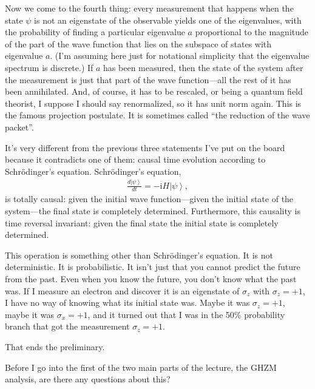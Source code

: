 \documentclass[twocolumn,prb]{revtex4}
\newcommand{\ket}[1]{\left|#1\right\rangle}
\renewcommand{\i}{\text{i}}
\begin{document}
Now we come to the fourth thing:  every measurement that happens when the state $\psi$ is not an eigenstate of the observable yields one of the eigenvalues, with the probability of finding a particular eigenvalue $a$ proportional to the magnitude of the part of the wave function that lies on the subspace of states with eigenvalue $a$. (I'm assuming here just for notational simplicity that the eigenvalue spectrum is discrete.) If $a$ has been measured, then the state of the system after the measurement is just that part of the wave function---all the rest of it has been annihilated. And, of course, it has to be rescaled, or being a quantum field theorist, I suppose I should say renormalized, so it has unit norm again. This is the famous projection postulate.  It is sometimes called ``the reduction of the wave packet''. 

It's very different from the previous three statements I've put on the board because it contradicts one of them: causal time evolution according to Schrödinger's equation.  Schrödinger's equation,
\begin{align}
  \frac{d\ket{\psi}}{dt} = -\i H\ket{\psi},
\end{align}
is totally causal: given the initial wave function---given the initial state of the system---the final state is completely determined. Furthermore, this causality is time reversal invariant: given the final state the initial state is completely determined.

This operation is something other than Schrödinger's equation. It is not deterministic. It is probabilistic. It isn't just that you cannot predict the future from the past. Even when you know the future, you don't know what the past was. If I measure an electron and discover it is an eigenstate of $\sigma_z$ with $\sigma_z = +1$, I have no way of knowing what its initial state was. Maybe it was $\sigma_z = +1$, maybe it was $\sigma_x = +1$, and it turned out that I was in the 50\% probability branch that got the measurement $\sigma_z = +1$.

That ends the preliminary.
\medskip

Before I go into the first of the two main parts of the lecture, the GHZM \cite{greenberger-89proc,mermin90pt9}
analysis, are there any questions about this?
\end{document}
